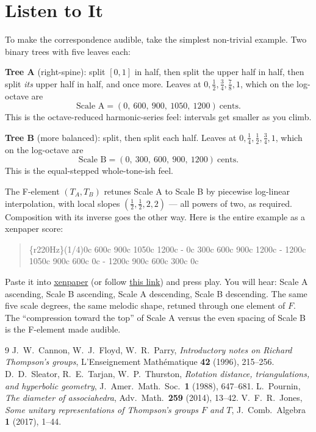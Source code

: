 \documentclass[11pt]{article}
\begin{document}
\section{Listen to It}

To make the correspondence audible, take the simplest non-trivial example. Two binary trees with five leaves each:

\medskip
\noindent\textbf{Tree A} (right-spine): split $[0,1]$ in half, then split the upper half in half, then split \emph{its} upper half in half, and once more. Leaves at $0, \tfrac12, \tfrac34, \tfrac78, 1$, which on the log-octave are
\[
\text{Scale A} = (0,\ 600,\ 900,\ 1050,\ 1200)\ \text{cents}.
\]
This is the octave-reduced harmonic-series feel: intervals get smaller as you climb.

\medskip
\noindent\textbf{Tree B} (more balanced): split, then split each half. Leaves at $0, \tfrac14, \tfrac12, \tfrac34, 1$, which on the log-octave are
\[
\text{Scale B} = (0,\ 300,\ 600,\ 900,\ 1200)\ \text{cents}.
\]
This is the equal-stepped whole-tone-ish feel.

\medskip

The F-element $(T_A, T_B)$ retunes Scale A to Scale B by piecewise log-linear interpolation, with local slopes $(\tfrac12, \tfrac12, 2, 2)$ --- all powers of two, as required. Composition with its inverse goes the other way. Here is the entire example as a xenpaper score:

\begin{quote}
\ttfamily\small
\{r220Hz\}(1/4)0c 600c 900c 1050c 1200c - 0c 300c 600c 900c 1200c - 1200c 1050c 900c 600c 0c - 1200c 900c 600c 300c 0c
\end{quote}

\noindent Paste it into \href{https://dxinteractive.github.io/xenpaper/}{xenpaper} (or follow \href{https://dxinteractive.github.io/xenpaper/\#\{r220Hz\}(1/4)0c_600c_900c_1050c_1200c_-_0c_300c_600c_900c_1200c_-_1200c_1050c_900c_600c_0c_-_1200c_900c_600c_300c_0c}{this link}) and press play. You will hear: Scale A ascending, Scale B ascending, Scale A descending, Scale B descending. The same five scale degrees, the same melodic shape, retuned through one element of $F$. The ``compression toward the top'' of Scale A versus the even spacing of Scale B is the F-element made audible.

\begin{thebibliography}{9}
 J.~W.~Cannon, W.~J.~Floyd, W.~R.~Parry, \emph{Introductory notes on Richard Thompson's groups}, L'Enseignement Math\'ematique \textbf{42} (1996), 215--256.
 D.~D.~Sleator, R.~E.~Tarjan, W.~P.~Thurston, \emph{Rotation distance, triangulations, and hyperbolic geometry}, J.~Amer.~Math.~Soc.~\textbf{1} (1988), 647--681.
 L.~Pournin, \emph{The diameter of associahedra}, Adv.~Math.~\textbf{259} (2014), 13--42.
 V.~F.~R.~Jones, \emph{Some unitary representations of Thompson's groups $F$ and $T$}, J.~Comb.~Algebra \textbf{1} (2017), 1--44.
\end{thebibliography}
\end{document}
